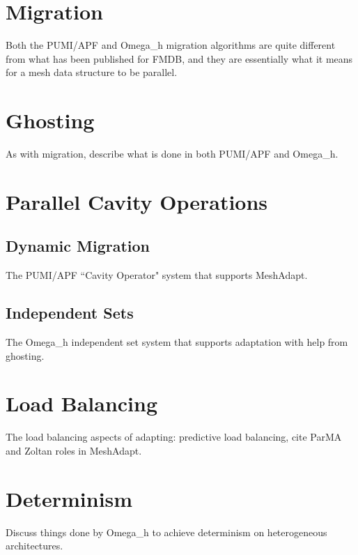 \section{Migration}

Both the PUMI/APF and Omega\_h migration algorithms
are quite different from what has been published for FMDB,
and they are essentially what it means for a mesh
data structure to be parallel.

\section{Ghosting}

As with migration, describe what is done in both PUMI/APF
and Omega\_h.

\section{Parallel Cavity Operations}

\subsection{Dynamic Migration}

The PUMI/APF ``Cavity Operator" system that supports MeshAdapt.

\subsection{Independent Sets}

The Omega\_h independent set system that supports adaptation
with help from ghosting.

\section{Load Balancing}

The load balancing aspects of adapting:
predictive load balancing, cite ParMA and Zoltan
roles in MeshAdapt.

\section{Determinism}

Discuss things done by Omega\_h to achieve
determinism on heterogeneous architectures.



